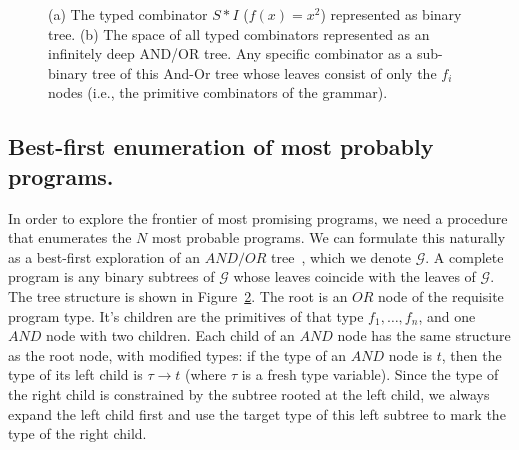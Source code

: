 \documentclass{article}
\begin{document}
\begin{figure}
\begin{subfigure}[After]{0.4\linewidth}
    \label{fig:andor}
    \end{subfigure}
  \caption{(a) The typed combinator $S * I$ ($f(x)=x^2$) represented as
    binary tree. (b) The space of all typed combinators represented as an
    infinitely deep AND/OR tree. Any specific combinator as a
    sub-binary tree of this And-Or tree whose leaves consist of only
    the $f_i$ nodes (i.e., the primitive combinators of the grammar).}

\end{figure}

\subsection{Best-first enumeration of most probably programs.}
In order to explore the frontier of most promising programs, we need a
procedure that enumerates the $N$ most probable programs. We can
formulate this naturally as a best-first exploration of an $AND/OR$
tree~\cite{nilsson1982principles}, which we denote $\mathcal{G}$. A
complete program is any binary subtrees of $\mathcal{G}$ whose leaves
coincide with the leaves of $\mathcal{G}$. The tree structure is shown
in Figure~\ref{fig:andor}. The root is an $OR$ node of the requisite
program type. It's children are the primitives of that type $f_1,
\dots, f_n$, and one $AND$ node with two children. Each child of an
$AND$ node has the same structure as the root node, with modified
types: if the type of an $AND$ node is $t$, then the type of its left
child is $\tau \rightarrow t$ (where $\tau$ is a fresh type
variable). Since the type of the right child is constrained by the
subtree rooted at the left child, we always expand the left child
first and use the target type of this left subtree to mark the type of
the right child.
\end{document}
